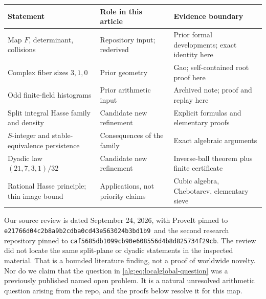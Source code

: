 \documentclass[11pt]{article}
\numberwithin{equation}{section}
\theoremstyle{plain}
\theoremstyle{plain}
\theoremstyle{plain}
\theoremstyle{definition}
\theoremstyle{definition}
\theoremstyle{definition}
\theoremstyle{remark}
\newcommand{\psha}{\nolinkurl{e21766d04c2b8a9b2cdba0cd43e563024b3bd1b9}}
\newcommand{\rsha}{\nolinkurl{caf5685db1099cb90e608556d4b8d825734f29cb}}
\begin{document}
\begin{center}\small
\begin{tabular}{p{}p{}p{}}
\toprule
Statement & Role in this article & Evidence boundary\\
\midrule
Map $F$, determinant, collisions & Repository input; rederived & Prior formal developments; exact identity here\\
Complex fiber sizes $3,1,0$ & Prior geometry & Gao; self-contained root proof here\\
Odd finite-field histograms & Prior arithmetic input & Archived note; proof and replay here\\
Split integral Hasse family and density & Candidate new refinement & Explicit formulas and elementary proofs\\
$S$-integer and stable-equivalence persistence & Consequences of the family & Exact algebraic arguments\\
Dyadic law $(21,7,3,1)/32$ & Candidate new refinement & Inverse-ball theorem plus finite certificate\\
Rational Hasse principle; thin image bound & Applications, not priority claims & Cubic algebra, Chebotarev, elementary sieve\\
\bottomrule
\end{tabular}
\end{center}

Our source review is dated September 24, 2026, with ProveIt pinned to
\psha\ and the second research repository pinned to \rsha.
The review did not locate the same split-plane or dyadic statements in
the inspected material. That is a bounded literature finding, not a proof
of worldwide novelty. Nor do we claim that the question in
\eqref{alg:eq:localglobal-question} was a previously published named open
problem. It is a natural unresolved arithmetic question arising from the
repo, and the proofs below resolve it for this map.
\end{document}
